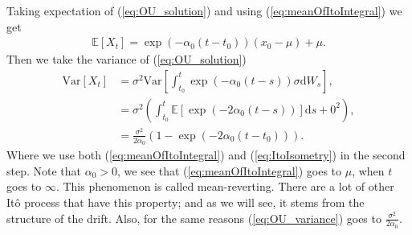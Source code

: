 Taking expectation of (\ref{eq:OU_solution}) and using (\ref{eq:meanOfItoIntegral}) we get
\begin{align}
    \mathbb{E}\left[X_t\right] = \exp\left(-\alpha_0\left(t - t_0\right)\right)\left(x_0 - \mu\right) + \mu. \label{eq:OU_mean}
\end{align}
Then we take the variance of (\ref{eq:OU_solution})
\begin{align}
    \mathrm{Var}\left[X_t\right] &= \sigma^2\mathrm{Var}\left[\int_{t_0}^t \exp\left(-\alpha_0 \left(t - s\right)\right)\sigma \mathrm{d}W_s\right],\nonumber \\
    & = \sigma^2\left(\int_{t_0}^t \mathbb{E}\left[\exp\left(-2\alpha_0\left(t - s\right)\right)\right] \mathrm{d}s + 0^2 \right), \nonumber \\
    & = \frac{\sigma^2}{2\alpha_0}\left(1 - \exp\left(-2\alpha_0(t - t_0)\right)\right). \label{eq:OU_variance}
\end{align}
Where we use both (\ref{eq:meanOfItoIntegral}) and (\ref{eq:ItoIsometry}) in the second step. Note that $\alpha_0 > 0$, we see that (\ref{eq:meanOfItoIntegral}) goes to $\mu$, when $t$ goes to $\infty$. This phenomenon is called mean-reverting. There are a lot of other Itô process that have this property; and as we will see, it stems from the structure of the drift. Also, for the same reasons (\ref{eq:OU_variance}) goes to $\frac{\sigma^2}{2\alpha_0}$.
